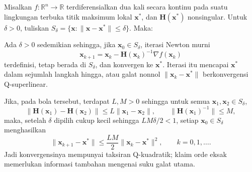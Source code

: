 \begin{theorem} Misalkan $f:\mathbb{R}^n\rightarrow\mathbb{R}$ terdiferensialkan dua kali secara kontinu pada suatu lingkungan terbuka titik maksimum lokal $\mathbf{x}^*$, dan $\mathbf{H}(\mathbf{x}^*)$ nonsingular. Untuk $\delta>0$, tuliskan $S_\delta=\{\mathbf{x}:\lVert\mathbf{x}-\mathbf{x}^*\rVert\leq\delta\}$. Maka:
\begin{enumerate*}
\item Ada $\delta>0$ sedemikian sehingga, jika $\mathbf{x}_0\in S_\delta$, iterasi Newton murni
\begin{equation}
\mathbf{x}_{k+1}=\mathbf{x}_k-\mathbf{H}(\mathbf{x}_k)^{-1}\nabla f(\mathbf{x}_k)
\end{equation}
terdefinisi, tetap berada di $S_\delta$, dan konvergen ke $\mathbf{x}^*$. Iterasi itu mencapai $\mathbf{x}^*$ dalam sejumlah langkah hingga, atau galat nonnol $\lVert\mathbf{x}_k-\mathbf{x}^*\rVert$ berkonvergensi Q-superlinear.
\item Jika, pada bola tersebut, terdapat $L,M>0$ sehingga untuk semua $\mathbf{x}_1,\mathbf{x}_2\in S_\delta$,
\begin{equation}
\lVert\mathbf{H}(\mathbf{x}_1)-\mathbf{H}(\mathbf{x}_2)\rVert
\leq L\lVert\mathbf{x}_1-\mathbf{x}_2\rVert,
\qquad
\lVert\mathbf{H}(\mathbf{x}_1)^{-1}\rVert\leq M,
\end{equation}
maka, setelah $\delta$ dipilih cukup kecil sehingga $LM\delta/2<1$, setiap $\mathbf{x}_0\in S_\delta$ menghasilkan
\begin{equation}
\lVert\mathbf{x}_{k+1}-\mathbf{x}^*\rVert
\leq\frac{LM}{2}\lVert\mathbf{x}_k-\mathbf{x}^*\rVert^2,
\qquad k=0,1,\dots.
\end{equation}
Jadi konvergensinya mempunyai taksiran Q-kuadratik; klaim orde eksak memerlukan informasi tambahan mengenai suku galat utama.
\end{enumerate*}
\end{theorem}
